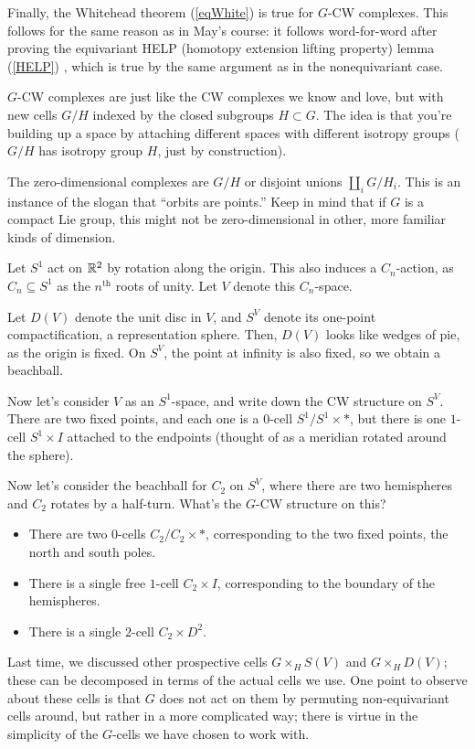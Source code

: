 Finally, the Whitehead theorem (\cref{eqWhite}) is true for $G$-CW complexes. This follows for the same reason as
in May's course: it follows word-for-word after proving the equivariant HELP (homotopy extension lifting property)
lemma (\cref{HELP}) , which is true by the same argument as in the nonequivariant case.

$G$-CW complexes are just like the CW complexes we know and love, but with new cells $G/H$ indexed by the closed
subgroups $H\subset G$. The idea is that you're building up a space by attaching different spaces with different
isotropy groups ($G/H$ has isotropy group $H$, just by construction).
\begin{exm}
The zero-dimensional complexes are $G/H$ or disjoint unions $\amalg_i G/H_i$. This is an instance of the slogan
that ``orbits are points.'' Keep in mind that if $G$ is a compact Lie group, this might not be zero-dimensional in
other, more familiar kinds of dimension.
\end{exm}
\begin{exm}
\label{S2sigmaCW}
Let $S^1$ act on $\mathbb R^2$ by rotation along the origin. This also induces a $C_n$-action, as $C_n\subseteq S^1$ as
the $n^{\text{th}}$ roots of unity. Let $V$ denote this $C_n$-space.

Let $D(V)$ denote the unit disc in $V$, and $S^V$ denote its one-point compactification, a representation sphere.
Then, $D(V)$ looks like wedges of pie, as the origin is fixed. On $S^V$, the point at infinity is also fixed, so we
obtain a beachball. %

Now let's consider $V$ as an $S^1$-space, and write down the CW structure on $S^V$. There are two fixed points, and
each one is a $0$-cell $S^1/S^1\times *$, but there is one $1$-cell $S^1\times I$ attached to the endpoints
(thought of as a meridian rotated around the sphere).

Now let's consider the beachball for $C_2$ on $S^V$, where there are two hemispheres and $C_2$ rotates by a
half-turn. What's the $G$-CW structure on this?
\begin{itemize}
	\item There are two $0$-cells $C_2/C_2\times *$, corresponding to the two fixed points, the north and south
	poles.
	\item There is a single free $1$-cell $C_2\times I$, corresponding to the boundary of the hemispheres.
	\item There is a single $2$-cell $C_2\times D^2$.\qedhere
\end{itemize}
\end{exm}
Last time, we discussed other prospective cells $G\times_H S(V)$ and $G\times_H D(V)$; these can be decomposed in
terms of the actual cells we use.  One point to observe about these cells is that $G$ does not act on them by permuting non-equivariant cells around, but rather in a more complicated way; there is virtue in the simplicity of the $G$-cells we have chosen to work with.

